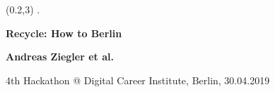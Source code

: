 \begin{textblock}{27}(0.2,3)
{\white .}

\vspace{1mm}

\begin{center}
{\Huge \bf \sf \color{blendedblue} Recycle: How to Berlin}

\vspace{30mm}

{\LARGE \bf Andreas Ziegler et al.}

\vspace{20mm}

{\large 4th Hackathon @ Digital Career Institute, Berlin, 30.04.2019}

\vspace{10mm}


\end{center}

\end{textblock}

\ \newpage
